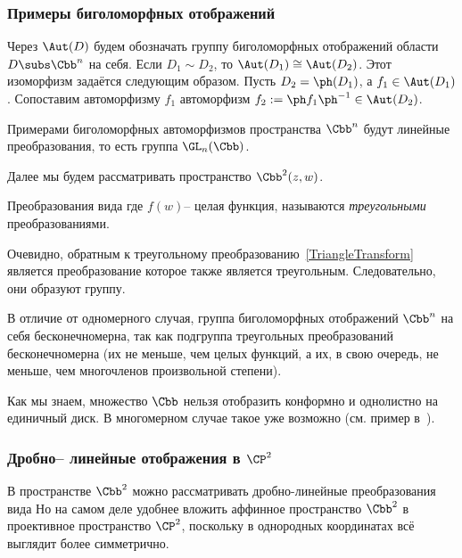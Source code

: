 \documentclass[a4paper]{article}
\begin{document}
\subsubsection{Примеры биголоморфных отображений}

Через $\Aut(D)$ будем обозначать группу биголоморфных отображений области $D \subs \Cbb^n$ на себя.
Если $D_1 \sim D_2$, то $\Aut(D_1) \cong \Aut(D_2)$. Этот изоморфизм задаётся следующим образом.
Пусть $D_2 = \ph(D_1)$, а $f_1 \in \Aut(D_1)$. Сопоставим автоморфизму $f_1$ автоморфизм
$f_2 := \ph f_1 \ph^{-1} \in \Aut(D_2)$.

Примерами биголоморфных автоморфизмов пространства $\Cbb^n$ будут линейные преобразования,
то есть группа $\GL_n(\Cbb)$.

Далее мы будем рассматривать пространство $\Cbb^2(z,w)$.

\begin{df}
Преобразования вида
где $f(w)$-- целая функция, называются \emph{треугольными} преобразованиями.
\end{df}

Очевидно, обратным к треугольному преобразованию~\eqref{TriangleTransform} является преобразование
которое также является треугольным. Следовательно, они образуют группу.

\begin{note}
В отличие от одномерного случая, группа биголоморфных отображений $\Cbb^n$ на себя бесконечномерна,
так как подгруппа треугольных преобразований бесконечномерна (их не меньше, чем целых функций, а их, в
свою очередь, не меньше, чем многочленов произвольной степени).
\end{note}

Как мы знаем, множество $\Cbb$ нельзя отобразить конформно и однолистно на единичный диск. В многомерном
случае такое уже возможно (см. пример в~\cite{shabat}).

\subsubsection{Дробно-- линейные отображения в $\CP^2$}

В пространстве $\Cbb^2$ можно рассматривать дробно-линейные преобразования вида
Но на самом деле удобнее вложить аффинное пространство $\Cbb^2$ в проективное пространство $\CP^2$,
поскольку в однородных координатах всё выглядит более симметрично.
\end{document}
